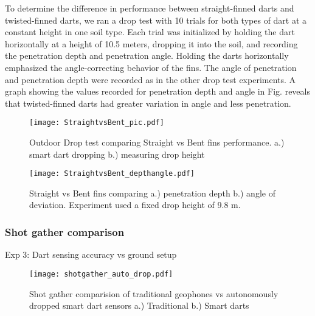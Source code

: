  To determine the difference in performance between straight-finned darts and twisted-finned darts, we ran a drop test with 10 trials for both types of dart at a constant height in one soil type. Each trial was initialized by holding the dart horizontally at a height of 10.5 meters, dropping it into the soil, and recording the penetration depth and penetration angle. Holding the darts horizontally emphasized the angle-correcting behavior of the fins. The angle of penetration and penetration depth were recorded as in the other drop test experiments. A graph showing the values recorded for penetration depth and angle in Fig. reveals that twisted-finned darts had greater variation in angle and less penetration.
\begin{figure} \centering
  {\texttt{[image: StraightvsBent\_pic.pdf]}}
 \caption{Outdoor Drop test comparing Straight vs Bent fins performance.
 a.)  smart dart dropping 
 b.)  measuring drop height} 
 \label{fig:StraightBentPic}
 \vspace{-1em}
\end{figure}
\begin{figure} \centering
  {\texttt{[image: StraightvsBent\_depthangle.pdf]}}
 \caption{\label{fig:StraightBentDepth}Straight vs Bent fins comparing a.) penetration depth b.) angle of deviation. Experiment used a fixed drop height of 9.8 m.  }
\end{figure}
\subsubsection{Shot gather comparison}
Exp 3: Dart sensing accuracy vs ground setup

\begin{figure} \centering
  {\texttt{[image: shotgather\_auto\_drop.pdf]}}
 \caption{Shot gather comparision of traditional geophones vs autonomously dropped smart dart sensors a.) Traditional b.) Smart darts} 
 \label{fig:TradvsAutoDrop}
\end{figure}


 